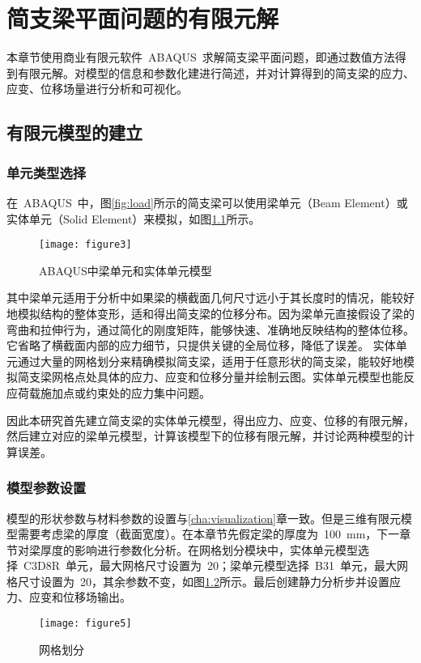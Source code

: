 \chapter{简支梁平面问题的有限元解}
\label{cha:FEAsolution}
本章节使用商业有限元软件~ABAQUS~求解简支梁平面问题，即通过数值方法得到有限元解。对模型的信息和参数化建进行简述，并对计算得到的简支梁的应力、应变、位移场量进行分析和可视化。
\section{有限元模型的建立}
\subsection{单元类型选择}
在~ABAQUS~中，图\ref{fig:load}所示的简支梁可以使用梁单元（Beam Element）或实体单元（Solid Element）来模拟\cite{souza2014finite,frangi2010finite}，如图\ref{fig:models}所示。
\begin{figure}[htbp]
    \centering
	\texttt{[image: figure3]}
    \caption{ABAQUS中梁单元和实体单元模型}
    \label{fig:models}
\end{figure}
其中梁单元适用于分析中如果梁的横截面几何尺寸远小于其长度时的情况，能较好地模拟结构的整体变形，适和得出简支梁的位移分布。因为梁单元直接假设了梁的弯曲和拉伸行为，通过简化的刚度矩阵，能够快速、准确地反映结构的整体位移。它省略了横截面内部的应力细节，只提供关键的全局位移，降低了误差。
实体单元通过大量的网格划分来精确模拟简支梁，适用于任意形状的简支梁，能较好地模拟简支梁网格点处具体的应力、应变和位移分量并绘制云图。实体单元模型也能反应荷载施加点或约束处的应力集中问题\cite{belytschko2013nonlinear}。

因此本研究首先建立简支梁的实体单元模型，得出应力、应变、位移的有限元解，然后建立对应的梁单元模型，计算该模型下的位移有限元解，并讨论两种模型的计算误差。
\subsection{模型参数设置}
模型的形状参数与材料参数的设置与\ref{cha:visualization}章一致。但是三维有限元模型需要考虑梁的厚度（截面宽度）。在本章节先假定梁的厚度为~100~mm，下一章节对梁厚度的影响进行参数化分析。在网格划分模块中，实体单元模型选择~C3D8R~单元，最大网格尺寸设置为~20；梁单元模型选择~B31~单元，最大网格尺寸设置为~20，其余参数不变\cite{radon2015study}，如图\ref{fig:mesh}所示。最后创建静力分析步并设置应力、应变和位移场输出\cite{liu2016review}。
\begin{figure}[htbp]
    \centering
	\texttt{[image: figure5]}
    \caption{网格划分}
    \label{fig:mesh}
\end{figure}
